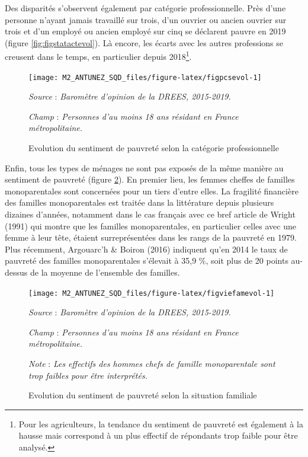 \documentclass[12pt,a4paper]{reedthesis}
\begin{document}
Des disparités s'observent également par catégorie professionnelle. Près d'une personne n'ayant jamais travaillé sur trois, d'un ouvrier ou ancien ouvrier sur trois et d'un employé ou ancien employé sur cinq se déclarent pauvre en 2019 (figure \ref{fig:figstatactevol}). Là encore, les écarts avec les autres professions se creusent dans le temps, en particulier depuis 2018\footnote{Pour les agriculteurs, la tendance du sentiment de pauvreté est également à la hausse mais correspond à un plus effectif de répondants trop faible pour être analysé.}.
\begin{figure}[!ht]

{\centering \texttt{[image: M2\_ANTUNEZ\_SQD\_files/figure-latex/figpcsevol-1]} 

}

\caption[Evolution du sentiment de pauvreté selon la catégorie professionnelle]{Evolution du sentiment de pauvreté selon la catégorie professionnelle}\label{fig:figpcsevol}

\footnotesize


\emph{Source} : \emph{Baromètre d’opinion de la DREES, 2015-2019.}


\emph{Champ} : \emph{Personnes d’au moins 18 ans résidant en France métropolitaine.}
\normalsize\end{figure}

Enfin, tous les types de ménages ne sont pas exposés de la même manière au sentiment de pauvreté (figure \ref{fig:figviefamevol}). En premier lieu, les femmes cheffes de familles monoparentales sont concernées pour un tiers d'entre elles. La fragilité financière des familles monoparentales est traitée dans la littérature depuis plusieurs dizaines d'années, notamment dans le cas français avec ce bref article de Wright (1991) qui montre que les familles monoparentales, en particulier celles avec une femme à leur tête, étaient surreprésentées dans les rangs de la pauvreté en 1979. Plus récemment, Argouarc'h \& Boiron (2016) indiquent qu'en 2014 le taux de pauvreté des familles monoparentales s'élevait à 35,9 \%, soit plus de 20 points au-dessus de la moyenne de l'ensemble des familles.
\begin{figure}[!ht]

{\centering \texttt{[image: M2\_ANTUNEZ\_SQD\_files/figure-latex/figviefamevol-1]} 

}

\caption[Evolution du sentiment de pauvreté selon la situation familiale]{Evolution du sentiment de pauvreté selon la situation familiale}\label{fig:figviefamevol}

\footnotesize


\emph{Source} : \emph{Baromètre d’opinion de la DREES, 2015-2019.}


\emph{Champ} : \emph{Personnes d’au moins 18 ans résidant en France métropolitaine.}


\emph{Note} : \emph{Les effectifs des hommes chefs de famille monoparentale sont trop faibles pour être interprétés.}
\normalsize\end{figure}
\end{document}
